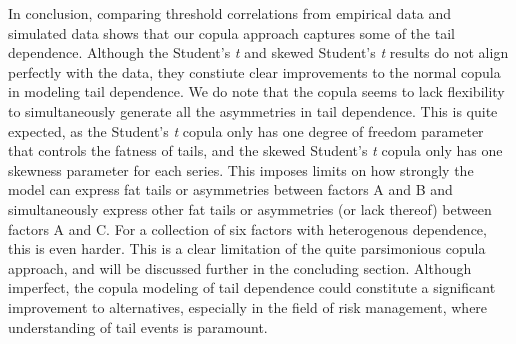 In conclusion, comparing threshold correlations from empirical data and simulated data shows that our copula approach captures some of the tail dependence. Although the Student's \textit{t} and skewed Student's \textit{t} results do not align perfectly with the data, they constiute clear improvements to the normal copula in modeling tail dependence. We do note that the copula seems to lack flexibility to simultaneously generate all the asymmetries in tail dependence. This is quite expected, as the Student's \textit{t} copula only has one degree of freedom parameter that controls the fatness of tails, and the skewed Student's \textit{t} copula only has one skewness parameter for each series. This imposes limits on how strongly the model can express fat tails or asymmetries between factors A and B and simultaneously express other fat tails or asymmetries (or lack thereof) between factors A and C. For a collection of six factors with heterogenous dependence, this is even harder. This is a clear limitation of the quite parsimonious copula approach, and will be discussed further in the concluding section. Although imperfect, the copula modeling of tail dependence could constitute a significant improvement to alternatives, especially in the field of risk management, where understanding of tail events is paramount.


